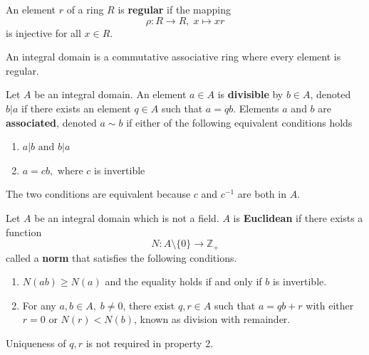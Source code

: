 \documentclass{article}
\begin{document}
      \begin{definition}
         An element $r$ of a ring $R$ is \textbf{regular} if the mapping 
         \begin{equation}
           \rho: R \longrightarrow R, \; x \mapsto x r
         \end{equation}
        is injective for all $x \in R$. 
      \end{definition}

      \begin{proposition}
        An integral domain is a commutative associative ring where every element is regular. 
      \end{proposition}

      \begin{definition}
        Let $A$ be an integral domain. An element $a \in A$ is \textbf{divisible} by $b \in A$, denoted $b | a$ if there exists an element $q \in A$ such that $a = q b$. Elements $a$ and $b$ are \textbf{associated}, denoted $a \sim b$ if either of the following equivalent conditions holds
        \begin{enumerate}
            \item $a | b \text{ and } b | a$
            \item $a = c b, \text{ where } c$ is invertible
        \end{enumerate}
        The two conditions are equivalent because $c$ and $c^{-1}$ are both in $A$. 
      \end{definition}

      \begin{definition}
        Let $A$ be an integral domain which is not a field. $A$ is \textbf{Euclidean} if there exists a function 
        \begin{equation}
          N: A \setminus \{ 0 \} \longrightarrow \mathbb{Z}_+
        \end{equation}
        called a \textbf{norm} that satisfies the following conditions. 
        \begin{enumerate}
          \item $N(a b) \geq N(a)$ and the equality holds if and only if $b$ is invertible. 
          \item For any $a, b \in A, \; b \neq 0$, there exist $q, r \in A$ such that $a = q b + r$ with either $r = 0$ or $ N(r) < N(b)$, known as division with remainder. 
        \end{enumerate}
        Uniqueness of $q, r$ is not required in property 2. 
      \end{definition}
\end{document}
